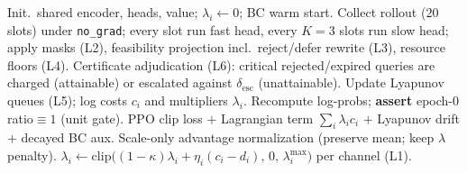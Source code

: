 \begin{algorithm}[t]
\caption{Risk-aware constrained hybrid-action PPO with certified escalation}
\label{alg:main}
\footnotesize
\begin{algorithmic}[1]
\STATE Init.\ shared encoder, heads, value; $\lambda_i\!\gets\!0$; BC warm start.
  \STATE Collect rollout ($20$ slots) under \texttt{no\_grad}; every slot run
         fast head, every $K{=}3$ slots run slow head; apply masks (L2),
         feasibility projection incl.\ reject/defer rewrite (L3), resource
         floors (L4).
  \STATE Certificate adjudication (L6): critical rejected/expired queries
         are charged (attainable) or escalated against
         $\delta_{\mathrm{esc}}$ (unattainable).
  \STATE Update Lyapunov queues (L5); log costs $c_i$ and multipliers $\lambda_i$.
    \STATE Recompute log-probs; \textbf{assert} epoch-0 ratio$\equiv1$ (unit gate).
    \STATE PPO clip loss $+$ Lagrangian term $\sum_i\lambda_i c_i$ $+$
           Lyapunov drift $+$ decayed BC aux.
    \STATE Scale-only advantage normalization (preserve mean; keep $\lambda$ penalty).
  \ENDFOR
    \STATE $\lambda_i\!\gets\!\mathrm{clip}\big((1{-}\kappa)\lambda_i+\eta_i(c_i-d_i),\,0,\,\lambda_i^{\max}\big)$
           per channel (L1).
  \ENDIF
\ENDFOR
\end{algorithmic}
\end{algorithm}

